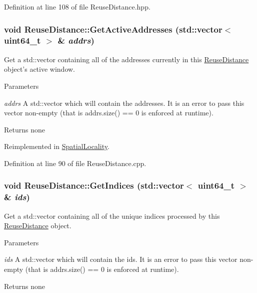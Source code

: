 Definition at line 108 of file ReuseDistance.hpp.

\hypertarget{class_reuse_distance_acc4885040a8a518fc10b5aa4da7d777a}{
\subsubsection[{GetActiveAddresses}]{\setlength{\rightskip}{0pt plus 5cm}void ReuseDistance::GetActiveAddresses (std::vector$<$ uint64\_\-t $>$ \& {\em addrs})}}
\label{class_reuse_distance_acc4885040a8a518fc10b5aa4da7d777a}
Get a std::vector containing all of the addresses currently in this \hyperlink{class_reuse_distance}{ReuseDistance} object's active window.


\begin{DoxyParams}{Parameters}
\item[{\em addrs}]A std::vector which will contain the addresses. It is an error to pass this vector non-\/empty (that is addrs.size() == 0 is enforced at runtime).\end{DoxyParams}
\begin{DoxyReturn}{Returns}
none 
\end{DoxyReturn}


Reimplemented in \hyperlink{class_spatial_locality_afef7ecfce7f238dbef37499e08edfb98}{SpatialLocality}.



Definition at line 90 of file ReuseDistance.cpp.

\hypertarget{class_reuse_distance_a99fb4b3aae663676515ad354691b7cc6}{
\subsubsection[{GetIndices}]{\setlength{\rightskip}{0pt plus 5cm}void ReuseDistance::GetIndices (std::vector$<$ uint64\_\-t $>$ \& {\em ids})}}
\label{class_reuse_distance_a99fb4b3aae663676515ad354691b7cc6}
Get a std::vector containing all of the unique indices processed by this \hyperlink{class_reuse_distance}{ReuseDistance} object.


\begin{DoxyParams}{Parameters}
\item[{\em ids}]A std::vector which will contain the ids. It is an error to pass this vector non-\/empty (that is addrs.size() == 0 is enforced at runtime).\end{DoxyParams}
\begin{DoxyReturn}{Returns}
none 
\end{DoxyReturn}


